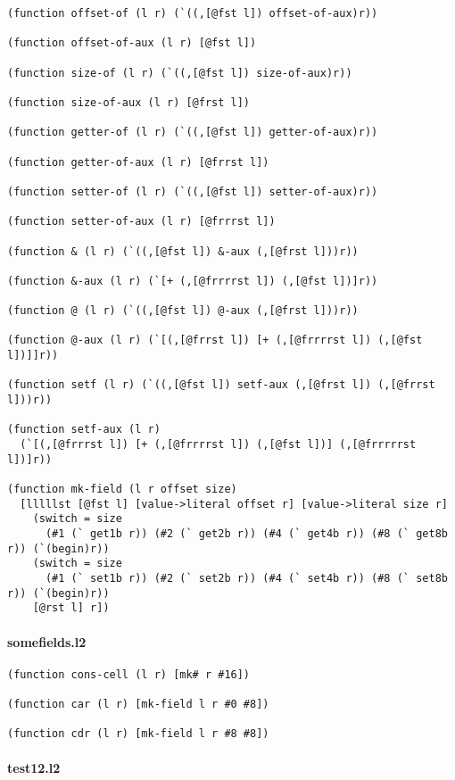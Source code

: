 \documentclass[]{article}
\let\oldparagraph\paragraph
\renewcommand{\paragraph}[1]{\oldparagraph{#1}\mbox{}}
\begin{document}
\begin{verbatim}
(function offset-of (l r) (`((,[@fst l]) offset-of-aux)r))

(function offset-of-aux (l r) [@fst l])

(function size-of (l r) (`((,[@fst l]) size-of-aux)r))

(function size-of-aux (l r) [@frst l])

(function getter-of (l r) (`((,[@fst l]) getter-of-aux)r))

(function getter-of-aux (l r) [@frrst l])

(function setter-of (l r) (`((,[@fst l]) setter-of-aux)r))

(function setter-of-aux (l r) [@frrrst l])

(function & (l r) (`((,[@fst l]) &-aux (,[@frst l]))r))

(function &-aux (l r) (`[+ (,[@frrrrst l]) (,[@fst l])]r))

(function @ (l r) (`((,[@fst l]) @-aux (,[@frst l]))r))

(function @-aux (l r) (`[(,[@frrst l]) [+ (,[@frrrrst l]) (,[@fst l])]]r))

(function setf (l r) (`((,[@fst l]) setf-aux (,[@frst l]) (,[@frrst l]))r))

(function setf-aux (l r)
  (`[(,[@frrrst l]) [+ (,[@frrrrst l]) (,[@fst l])] (,[@frrrrrst l])]r))

(function mk-field (l r offset size)
  [lllllst [@fst l] [value->literal offset r] [value->literal size r]
    (switch = size
      (#1 (` get1b r)) (#2 (` get2b r)) (#4 (` get4b r)) (#8 (` get8b r)) (`(begin)r))
    (switch = size
      (#1 (` set1b r)) (#2 (` set2b r)) (#4 (` set4b r)) (#8 (` set8b r)) (`(begin)r))
    [@rst l] r])
\end{verbatim}

\paragraph{somefields.l2}\label{somefields.l2}

\begin{verbatim}
(function cons-cell (l r) [mk# r #16])

(function car (l r) [mk-field l r #0 #8])

(function cdr (l r) [mk-field l r #8 #8])
\end{verbatim}

\paragraph{test12.l2}\label{test12.l2}
\end{document}
